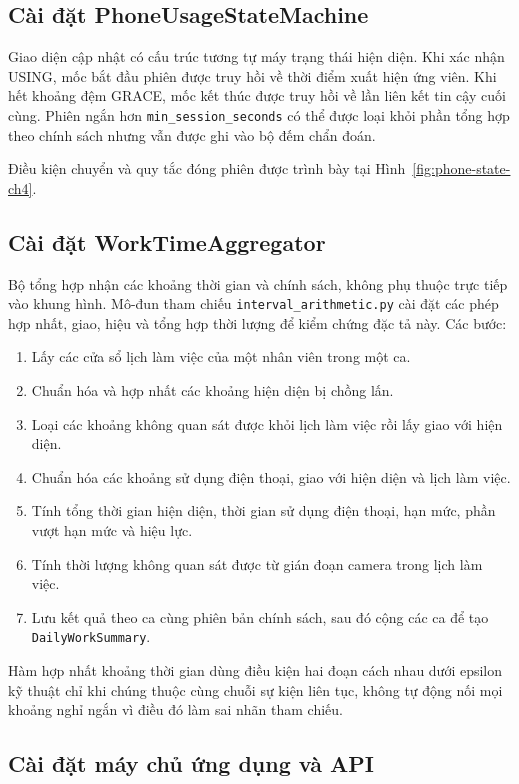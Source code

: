 \subsection{Cài đặt PhoneUsageStateMachine}
Giao diện cập nhật có cấu trúc tương tự máy trạng thái hiện diện. Khi xác nhận USING, mốc bắt đầu phiên được truy hồi về thời điểm xuất hiện ứng viên. Khi hết khoảng đệm GRACE, mốc kết thúc được truy hồi về lần liên kết tin cậy cuối cùng. Phiên ngắn hơn \texttt{min\_session\_seconds} có thể được loại khỏi phần tổng hợp theo chính sách nhưng vẫn được ghi vào bộ đếm chẩn đoán.

Điều kiện chuyển và quy tắc đóng phiên được trình bày tại Hình~\ref{fig:phone-state-ch4}.

\subsection{Cài đặt WorkTimeAggregator}
Bộ tổng hợp nhận các khoảng thời gian và chính sách, không phụ thuộc trực tiếp vào khung hình. Mô-đun tham chiếu \texttt{interval\_arithmetic.py} cài đặt các phép hợp nhất, giao, hiệu và tổng hợp thời lượng để kiểm chứng đặc tả này. Các bước:
\begin{enumerate}
\item Lấy các cửa sổ lịch làm việc của một nhân viên trong một ca.
\item Chuẩn hóa và hợp nhất các khoảng hiện diện bị chồng lấn.
\item Loại các khoảng không quan sát được khỏi lịch làm việc rồi lấy giao với hiện diện.
\item Chuẩn hóa các khoảng sử dụng điện thoại, giao với hiện diện và lịch làm việc.
\item Tính tổng thời gian hiện diện, thời gian sử dụng điện thoại, hạn mức, phần vượt hạn mức và hiệu lực.
\item Tính thời lượng không quan sát được từ gián đoạn camera trong lịch làm việc.
\item Lưu kết quả theo ca cùng phiên bản chính sách, sau đó cộng các ca để tạo \texttt{DailyWorkSummary}.
\end{enumerate}

Hàm hợp nhất khoảng thời gian dùng điều kiện hai đoạn cách nhau dưới epsilon kỹ thuật chỉ khi chúng thuộc cùng chuỗi sự kiện liên tục, không tự động nối mọi khoảng nghỉ ngắn vì điều đó làm sai nhãn tham chiếu.

\subsection{Cài đặt máy chủ ứng dụng và API}
